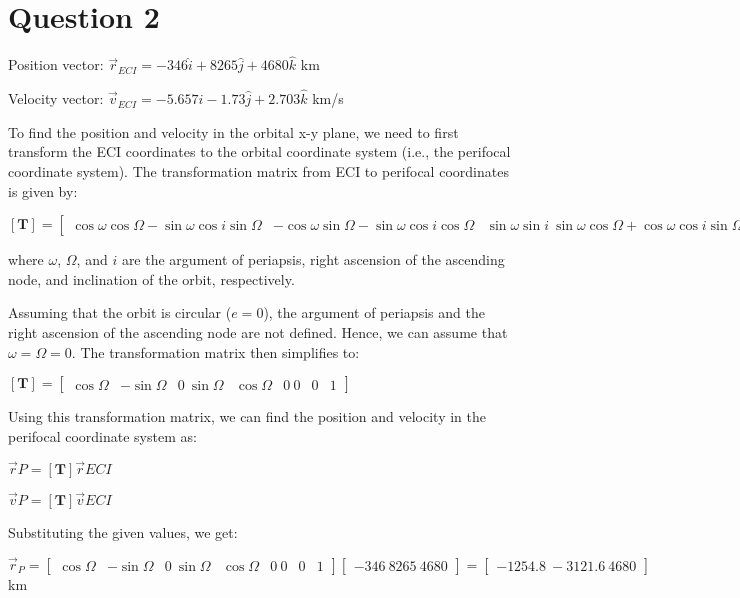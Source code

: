 \section{Question 2}
Position vector: $\vec{r}_{ECI} = -346\hat{i} + 8265\hat{j} + 4680\hat{k}$ km

Velocity vector: $\vec{v}_{ECI} = -5.657\hat{i} -1.73\hat{j} + 2.703\hat{k}$ km/s

To find the position and velocity in the orbital x-y plane, we need to first transform the ECI coordinates to the orbital coordinate system (i.e., the perifocal coordinate system). The transformation matrix from ECI to perifocal coordinates is given by:

$[\mathbf{T}] = \begin{bmatrix} \cos\omega\cos\Omega - \sin\omega\cos i\sin\Omega & -\cos\omega\sin\Omega - \sin\omega\cos i\cos\Omega & \sin\omega\sin i \ \sin\omega\cos\Omega + \cos\omega\cos i\sin\Omega & -\sin\omega\sin\Omega + \cos\omega\cos i\cos\Omega & -\cos\omega\sin i \ \sin i\sin\Omega & \sin i\cos\Omega & \cos i \end{bmatrix}$

where $\omega$, $\Omega$, and $i$ are the argument of periapsis, right ascension of the ascending node, and inclination of the orbit, respectively.

Assuming that the orbit is circular ($e=0$), the argument of periapsis and the right ascension of the ascending node are not defined. Hence, we can assume that $\omega = \Omega = 0$. The transformation matrix then simplifies to:

$[\mathbf{T}] = \begin{bmatrix} \cos\Omega & -\sin\Omega & 0 \ \sin\Omega & \cos\Omega & 0 \ 0 & 0 & 1 \end{bmatrix}$

Using this transformation matrix, we can find the position and velocity in the perifocal coordinate system as:

$\vec{r}{P} = [\mathbf{T}]\vec{r}{ECI}$

$\vec{v}{P} = [\mathbf{T}]\vec{v}{ECI}$

Substituting the given values, we get:

$\vec{r}_{P} = \begin{bmatrix} \cos\Omega & -\sin\Omega & 0 \ \sin\Omega & \cos\Omega & 0 \ 0 & 0 & 1 \end{bmatrix} \begin{bmatrix} -346 \ 8265 \ 4680 \end{bmatrix} = \begin{bmatrix} -1254.8 \ -3121.6 \ 4680 \end{bmatrix}$ km

